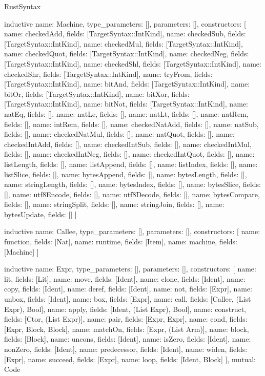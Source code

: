 \begin{lexlean}{RustSyntax}
\begin{semanticmodule}
inductive{
  name: Machine,
  type_parameters: [],
  parameters: [],
  constructors: [
    {name: checkedAdd, fields: [TargetSyntax::IntKind]},
    {name: checkedSub, fields: [TargetSyntax::IntKind]},
    {name: checkedMul, fields: [TargetSyntax::IntKind]},
    {name: checkedQuot, fields: [TargetSyntax::IntKind]},
    {name: checkedNeg, fields: [TargetSyntax::IntKind]},
    {name: checkedShl, fields: [TargetSyntax::IntKind]},
    {name: checkedShr, fields: [TargetSyntax::IntKind]},
    {name: tryFrom, fields: [TargetSyntax::IntKind]},
    {name: bitAnd, fields: [TargetSyntax::IntKind]},
    {name: bitOr, fields: [TargetSyntax::IntKind]},
    {name: bitXor, fields: [TargetSyntax::IntKind]},
    {name: bitNot, fields: [TargetSyntax::IntKind]},
    {name: natEq, fields: []},
    {name: natLe, fields: []},
    {name: natLt, fields: []},
    {name: natRem, fields: []},
    {name: intRem, fields: []},
    {name: checkedNatAdd, fields: []},
    {name: natSub, fields: []},
    {name: checkedNatMul, fields: []},
    {name: natQuot, fields: []},
    {name: checkedIntAdd, fields: []},
    {name: checkedIntSub, fields: []},
    {name: checkedIntMul, fields: []},
    {name: checkedIntNeg, fields: []},
    {name: checkedIntQuot, fields: []},
    {name: listLength, fields: []},
    {name: listAppend, fields: []},
    {name: listIndex, fields: []},
    {name: listSlice, fields: []},
    {name: bytesAppend, fields: []},
    {name: bytesLength, fields: []},
    {name: stringLength, fields: []},
    {name: bytesIndex, fields: []},
    {name: bytesSlice, fields: []},
    {name: utf8Encode, fields: []},
    {name: utf8Decode, fields: []},
    {name: bytesCompare, fields: []},
    {name: stringSplit, fields: []},
    {name: stringJoin, fields: []},
    {name: bytesUpdate, fields: []}
  ]
}

inductive{
  name: Callee,
  type_parameters: [],
  parameters: [],
  constructors: [
    {name: function, fields: [Nat]},
    {name: runtime, fields: [Item]},
    {name: machine, fields: [Machine]}
  ]
}

inductive{
  name: Expr,
  type_parameters: [],
  parameters: [],
  constructors: [
    {name: lit, fields: [Lit]},
    {name: move, fields: [Ident]},
    {name: clone, fields: [Ident]},
    {name: copy, fields: [Ident]},
    {name: deref, fields: [Ident]},
    {name: not, fields: [Expr]},
    {name: unbox, fields: [Ident]},
    {name: box, fields: [Expr]},
    {name: call, fields: [Callee, (List Expr), Bool]},
    {name: apply, fields: [Ident, (List Expr), Bool]},
    {name: construct, fields: [Ctor, (List Expr)]},
    {name: pair, fields: [Expr, Expr]},
    {name: cond, fields: [Expr, Block, Block]},
    {name: matchOn, fields: [Expr, (List Arm)]},
    {name: block, fields: [Block]},
    {name: uncons, fields: [Ident]},
    {name: isZero, fields: [Ident]},
    {name: nonZero, fields: [Ident]},
    {name: predecessor, fields: [Ident]},
    {name: widen, fields: [Expr]},
    {name: succeed, fields: [Expr]},
    {name: loop, fields: [Ident, Block]}
  ],
  mutual: Code
}


\end{semanticmodule}
\end{lexlean}
